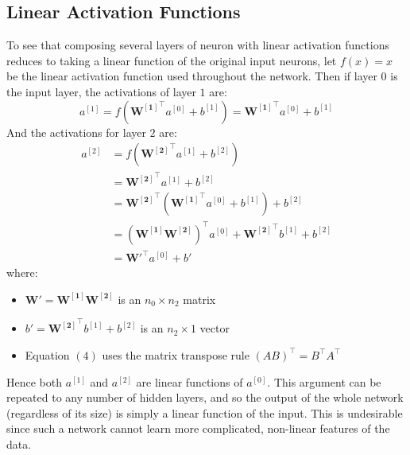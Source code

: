 \documentclass[11pt]{article} %
\theoremstyle{plain}
\theoremstyle{definition}
\begin{document}
\subsection{Linear Activation Functions} \label{linear-activation-functions}
To see that composing several layers of neuron with linear activation functions reduces to taking a linear function of the original input neurons, let \(f(x) = x\) be the linear activation function used throughout the network. Then if layer \(0\) is the input layer, the activations of layer \(1\) are:
\[a^{[1]} = f(\mathbf{{W^{[1]}}^{\top}}a^{[0]} + b^{[1]}) = \mathbf{{W^{[1]}}^{\top}}a^{[0]} + b^{[1]}\]
And the activations for layer \(2\) are:
\begin{align}
a^{[2]} &= f(\mathbf{{W^{[2]}}^{\top}}a^{[1]} + b^{[2]})  \\
      &= \mathbf{{W^{[2]}}^{\top}}a^{[1]} + b^{[2]} \\
      &= \mathbf{{W^{[2]}}^{\top}}(\mathbf{{W^{[1]}}^{\top}}a^{[0]} + b^{[1]}) + b^{[2]} \\
      &= \mathbf{(W^{[1]}W^{[2]})^{\top}}a^{[0]} + \mathbf{{W^{[2]}}^{\top}}b^{[1]} + b^{[2]} \\
      &= \mathbf{W'^{\top}}a^{[0]} + b' 
\end{align}
where:
\begin{itemize}
  \item \(\mathbf{W'} = \mathbf{W^{[1]}W^{[2]}}\)  is an \({n_0}\times{n_2}\) matrix
  \item \(b' = \mathbf{{W^{[2]}}^{\top}}b^{[1]} + b^{[2]}\) is an \({n_2}\times{1}\) vector
  \item Equation \((4)\) uses the matrix transpose rule \((AB)^{\top} = B^{\top}A^{\top}\)
\end{itemize}
Hence both \(a^{[1]}\) and \(a^{[2]}\) are linear functions of \(a^{[0]}\). This argument can be repeated to any number of hidden layers, and so the output of the whole network (regardless of its size) is simply a linear function of the input. This is undesirable since such a network cannot learn more complicated, non-linear features of the data.
\end{document}
